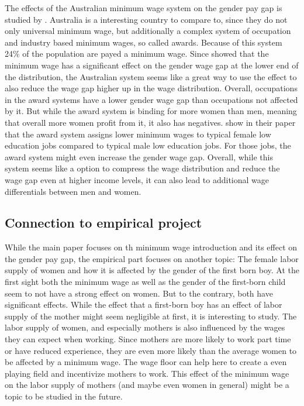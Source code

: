 \documentclass[12pt,draft,a4paper]{article}
\begin{document}
The effects of the Australian minimum wage system on the gender pay gap is studied by \citet{Broadway2017AUS}.
Australia is a interesting country to compare to, since they do not only universal minimum wage, but additionally a complex system of occupation and industry based minimum wages, so called awards. Because of this system 24\% of the population are payed a minimum wage. 
Since  showed that the minimum wage has a significant effect on the gender wage gap at the lower end of the distribution, the Australian system seems like a great way to use the effect to also reduce the wage gap higher up in the wage distribution. 
Overall, occupations in the award systems have a lower gender wage gap than occupations not affected by it.
But while the award system is binding for more women than men, meaning that overall more women profit from it, it also has negatives. \citeauthor{Broadway2017AUS} show in their paper that the award system assigns lower minimum wages to typical female low education jobs compared to typical male low education jobs.
For those jobs, the award system might even increase the gender wage gap.
Overall, while this system seems like a option to compress the wage distribution and reduce the wage gap even at higher income levels, it can also lead to additional wage differentials between men and women.





\subsection{Connection to empirical project} %
While the main paper focuses on th minimum wage introduction and its effect on the gender pay gap, the empirical part focuses on another topic: The female labor supply of women and how it is affected by the gender of the first born boy.
At the first sight both the minimum wage as well as the gender of the first-born child seem to not have a strong effect on women. But to the contrary, both have significant effects. While the effect that a first-born boy has an effect of labor supply of the mother might seem negligible at first, it is interesting to study. The labor supply of women, and especially mothers is also influenced by the wages they can expect when working. Since mothers are more likely to work part time or have reduced experience, they are even more likely than the average women to be affected by a minimum wage. The wage floor can help here to create a even playing field and incentivize mothers to work. This effect of the minimum wage on the labor supply of mothers (and maybe even women in general) might be a topic to be studied in the future.
\end{document}

